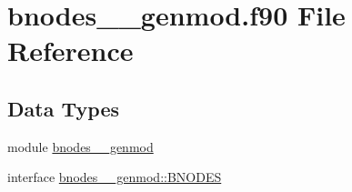 \hypertarget{bnodes____genmod_8f90}{\section{bnodes\+\_\+\+\_\+genmod.\+f90 File Reference}
\label{bnodes____genmod_8f90}
}
\subsection*{Data Types}
\begin{DoxyCompactItemize}
\item 
module \hyperlink{classbnodes____genmod}{bnodes\+\_\+\+\_\+genmod}
\item 
interface \hyperlink{interfacebnodes____genmod_1_1BNODES}{bnodes\+\_\+\+\_\+genmod\+::\+B\+N\+O\+D\+E\+S}
\end{DoxyCompactItemize}
